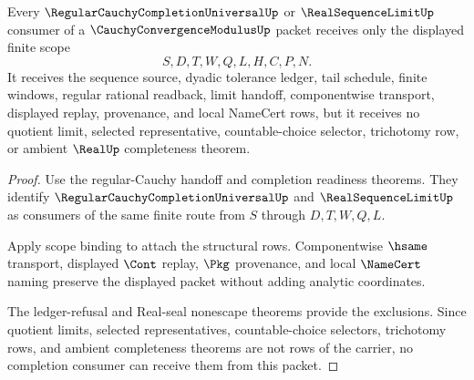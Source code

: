 \begin{theorem}
\label{thm:cauchy-convergence-modulus-completion-consumer-scope}
Every $\RegularCauchyCompletionUniversalUp$ or $\RealSequenceLimitUp$ consumer of a $\CauchyConvergenceModulusUp$ packet receives only the displayed finite scope
$$
S,D,T,W,Q,L,H,C,P,N.
$$
It receives the sequence source, dyadic tolerance ledger, tail schedule, finite windows, regular rational readback, limit handoff, componentwise transport, displayed replay, provenance, and local NameCert rows, but it receives no quotient limit, selected representative, countable-choice selector, trichotomy row, or ambient $\RealUp$ completeness theorem.
\end{theorem}
\begin{proof}
Use the regular-Cauchy handoff and completion readiness theorems. They identify $\RegularCauchyCompletionUniversalUp$ and $\RealSequenceLimitUp$ as consumers of the same finite route from $S$ through $D,T,W,Q,L$.

Apply scope binding to attach the structural rows. Componentwise $\hsame$ transport, displayed $\Cont$ replay, $\Pkg$ provenance, and local $\NameCert$ naming preserve the displayed packet without adding analytic coordinates.

The ledger-refusal and Real-seal nonescape theorems provide the exclusions. Since quotient limits, selected representatives, countable-choice selectors, trichotomy rows, and ambient completeness theorems are not rows of the carrier, no completion consumer can receive them from this packet.
\end{proof}

